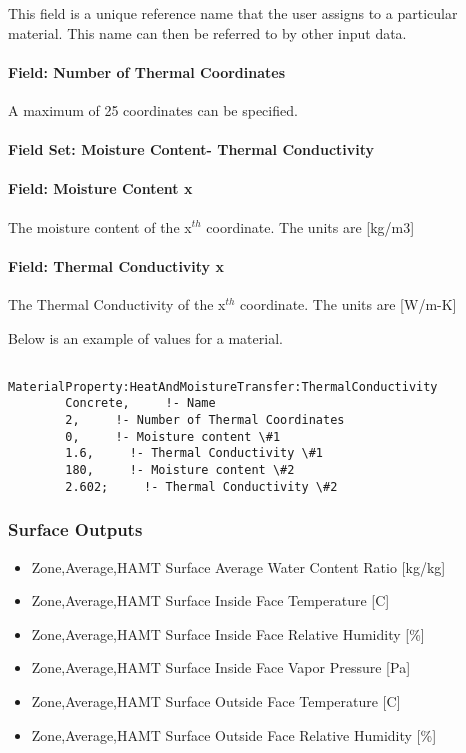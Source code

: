 This field is a unique reference name that the user assigns to a particular material. This name can then be referred to by other input data.

\paragraph{Field: Number of Thermal Coordinates}\label{field-number-of-thermal-coordinates}

A maximum of 25 coordinates can be specified.

\paragraph{Field Set: Moisture Content- Thermal Conductivity}\label{field-set-moisture-content--thermal-conductivity}

\paragraph{Field: Moisture Content x}\label{field-moisture-content-x-3}

The moisture content of the x\(^{th}\) coordinate. The units are {[}kg/m3{]}

\paragraph{Field: Thermal Conductivity x}\label{field-thermal-conductivity-x-1}

The Thermal Conductivity of the x\(^{th}\) coordinate. The units are {[}W/m-K{]}

Below is an example of values for a material.

\begin{lstlisting}

MaterialProperty:HeatAndMoistureTransfer:ThermalConductivity
        Concrete,     !- Name
        2,     !- Number of Thermal Coordinates
        0,     !- Moisture content \#1
        1.6,     !- Thermal Conductivity \#1
        180,     !- Moisture content \#2
        2.602;     !- Thermal Conductivity \#2
\end{lstlisting}

\subsubsection{Surface Outputs}\label{surface-outputs}

\begin{itemize}
\item
  Zone,Average,HAMT Surface Average Water Content Ratio {[}kg/kg{]}
\item
  Zone,Average,HAMT Surface Inside Face Temperature {[}C{]}
\item
  Zone,Average,HAMT Surface Inside Face Relative Humidity {[}\%{]}
\item
  Zone,Average,HAMT Surface Inside Face Vapor Pressure {[}Pa{]}
\item
  Zone,Average,HAMT Surface Outside Face Temperature {[}C{]}
\item
  Zone,Average,HAMT Surface Outside Face Relative Humidity {[}\%{]}
\end{itemize}

